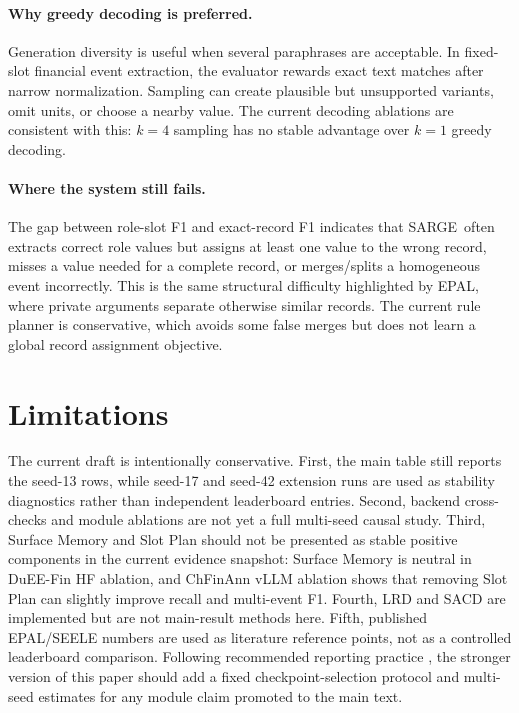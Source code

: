 \documentclass[11pt]{article}
\newcommand{\method}{SARGE}
\begin{document}
\paragraph{Why greedy decoding is preferred.}
Generation diversity is useful when several paraphrases are acceptable. In fixed-slot financial event extraction, the evaluator rewards exact text matches after narrow normalization. Sampling can create plausible but unsupported variants, omit units, or choose a nearby value. The current decoding ablations are consistent with this: $k=4$ sampling has no stable advantage over $k=1$ greedy decoding.

\paragraph{Where the system still fails.}
The gap between role-slot F1 and exact-record F1 indicates that \method\ often extracts correct role values but assigns at least one value to the wrong record, misses a value needed for a complete record, or merges/splits a homogeneous event incorrectly. This is the same structural difficulty highlighted by EPAL, where private arguments separate otherwise similar records. The current rule planner is conservative, which avoids some false merges but does not learn a global record assignment objective.

\section{Limitations}

The current draft is intentionally conservative. First, the main table still reports the seed-13 rows, while seed-17 and seed-42 extension runs are used as stability diagnostics rather than independent leaderboard entries. Second, backend cross-checks and module ablations are not yet a full multi-seed causal study. Third, Surface Memory and Slot Plan should not be presented as stable positive components in the current evidence snapshot: Surface Memory is neutral in DuEE-Fin HF ablation, and ChFinAnn vLLM ablation shows that removing Slot Plan can slightly improve recall and multi-event F1. Fourth, LRD and SACD are implemented but are not main-result methods here. Fifth, published EPAL/SEELE numbers are used as literature reference points, not as a controlled leaderboard comparison. Following recommended reporting practice \citep{reimers2017scoredist,dodge2019showyourwork}, the stronger version of this paper should add a fixed checkpoint-selection protocol and multi-seed estimates for any module claim promoted to the main text.
\end{document}

